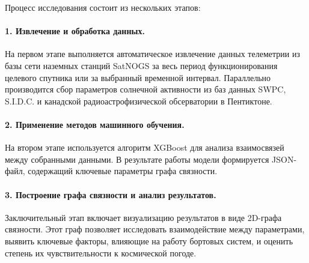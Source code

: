 \documentclass[14pt, a4paper]{bsu}
\begin{document}
Процесс исследования состоит из нескольких этапов:

\paragraph*{1. Извлечение и обработка данных.} На первом этапе
выполняется автоматическое извлечение данных телеметрии из базы сети
наземных станций SatNOGS за весь период функционирования целевого
спутника или за выбранный временной интервал. Параллельно
производится сбор параметров солнечной активности из баз данных SWPC,
S.I.D.C. и канадской радиоастрофизической обсерватории в Пентиктоне.

\paragraph*{2. Применение методов машинного обучения.} На втором
этапе используется алгоритм XGBoost для анализа взаимосвязей между
собранными данными. В результате работы модели формируется JSON-файл,
содержащий ключевые параметры графа связности.

\paragraph*{3. Построение графа связности и анализ результатов.}
Заключительный этап включает визуализацию результатов в виде 2D-графа
связности. Этот граф позволяет исследовать взаимодействие между
параметрами, выявить ключевые факторы, влияющие на работу бортовых
систем, и оценить степень их чувствительности к космической погоде.
\end{document}
